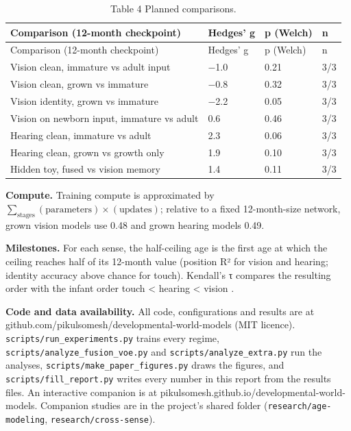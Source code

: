 \documentclass[
]{article}
\begin{document}
\begin{longtable}[]{@{}llll@{}}
\caption{Table 4 \textbar{} Planned comparisons.}\tabularnewline
\toprule\noalign{}
Comparison (12-month checkpoint) & Hedges' g & p (Welch) & n \\
\midrule\noalign{}
\endfirsthead
\toprule\noalign{}
Comparison (12-month checkpoint) & Hedges' g & p (Welch) & n \\
\midrule\noalign{}
\endhead
\bottomrule\noalign{}
\endlastfoot
Vision clean, immature vs adult input & −1.0 & 0.21 & 3/3 \\
Vision clean, grown vs immature & −0.8 & 0.32 & 3/3 \\
Vision identity, grown vs immature & −2.2 & 0.05 & 3/3 \\
Vision on newborn input, immature vs adult & 0.6 & 0.46 & 3/3 \\
Hearing clean, immature vs adult & 2.3 & 0.06 & 3/3 \\
Hearing clean, grown vs growth only & 1.9 & 0.10 & 3/3 \\
Hidden toy, fused vs vision memory & 1.4 & 0.11 & 3/3 \\
\end{longtable}

\textbf{Compute.} Training compute is approximated by
\(\sum_{\text{stages}}(\text{parameters})\times(\text{updates})\);
relative to a fixed 12-month-size network, grown vision models use 0.48
and grown hearing models 0.49.

\textbf{Milestones.} For each sense, the half-ceiling age is the first
age at which the ceiling reaches half of its 12-month value (position R²
for vision and hearing; identity accuracy above chance for touch).
Kendall's τ compares the resulting order with the infant order touch
\textless{} hearing \textless{} vision \citep{gottlieb1971ontogenesis}.

\textbf{Code and data availability.} All code, configurations and
results are at github.com/pikulsomesh/developmental-world-models (MIT
licence). \texttt{scripts/run\_experiments.py} trains every regime,
\texttt{scripts/analyze\_fusion\_voe.py} and
\texttt{scripts/analyze\_extra.py} run the analyses,
\texttt{scripts/make\_paper\_figures.py} draws the figures, and
\texttt{scripts/fill\_report.py} writes every number in this report from
the results files. An interactive companion is at
pikulsomesh.github.io/developmental-world-models. Companion studies are
in the project's shared folder (\texttt{research/age-modeling},
\texttt{research/cross-sense}).
\end{document}
